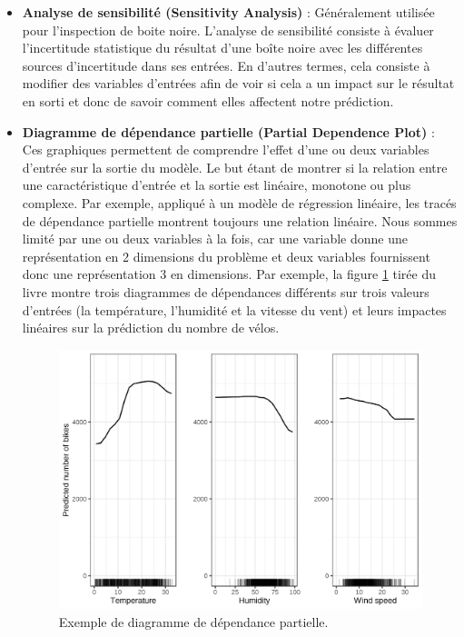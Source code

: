\begin{itemize}
    \item \textbf{Analyse de sensibilité (Sensitivity Analysis)} : Généralement utilisée pour l'inspection de boite noire. L'analyse de sensibilité consiste à évaluer l’incertitude statistique du résultat d’une boîte noire avec les différentes sources d’incertitude dans ses entrées. En d'autres termes, cela consiste à modifier des variables d'entrées afin de voir si cela a un impact sur le résultat en sorti et donc de savoir comment elles affectent notre prédiction.
    
    \item \textbf{Diagramme de dépendance partielle (Partial Dependence Plot)} : Ces graphiques permettent de comprendre l'effet d'une ou deux variables d'entrée sur la sortie du modèle. Le but étant de  montrer si la relation entre une caractéristique d'entrée et la sortie est linéaire, monotone ou plus complexe. Par exemple, appliqué à un modèle de régression linéaire, les tracés de dépendance partielle montrent toujours une relation linéaire. Nous sommes limité par une ou deux variables à la fois, car une variable donne une représentation en 2 dimensions du problème et deux variables fournissent donc une représentation 3 en dimensions. Par exemple, la figure \ref{partialDependencePlot} tirée du livre \cite{molnar2019} montre trois diagrammes de dépendances différents sur trois valeurs d'entrées (la température, l'humidité et la vitesse du vent) et leurs impactes linéaires sur la prédiction du nombre de vélos.
    \begin{figure}[h]
        \includegraphics[scale=0.17]{src_img/partialDependencePlot.png}
        \caption{Exemple de diagramme de dépendance partielle.}
        \label{partialDependencePlot}
    \end{figure}
    

\end{itemize}
